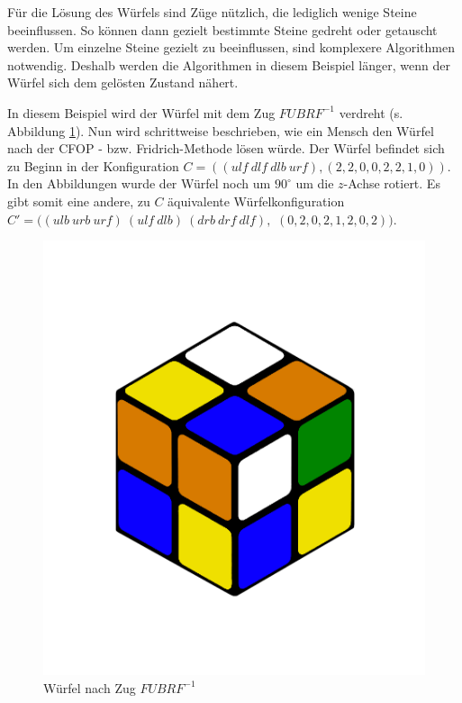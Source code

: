 \documentclass[12pt,a4paper, usenames, dvipsnames]{article}
\theoremstyle{mystyle}
\theoremstyle{definition}
\begin{document}
Für die Lösung des Würfels sind Züge nützlich, die lediglich wenige Steine beeinflussen. So können dann gezielt bestimmte Steine gedreht oder getauscht werden. Um einzelne Steine gezielt zu beeinflussen, sind komplexere Algorithmen notwendig. Deshalb werden die Algorithmen in diesem Beispiel länger, wenn der Würfel sich dem gelösten Zustand nähert. 

In diesem Beispiel wird der Würfel mit dem Zug $FUBRF^{-1}$ verdreht (s. Abbildung \ref{Abbildung_LösungMensch0}). Nun wird schrittweise beschrieben, wie ein Mensch den Würfel nach der CFOP - bzw. Fridrich-Methode lösen würde. Der Würfel befindet sich zu Beginn in der Konfiguration $C = ((\textit{ulf} \ \textit{dlf} \ \textit{dlb} \ \textit{urf}),(2,2,0,0,2,2,1,0))$.
In den Abbildungen wurde der Würfel noch um $90^\circ$ um die $z$-Achse rotiert. Es gibt somit eine andere, zu $C$ äquivalente Würfelkonfiguration $C'=(( \textit{ulb} \ \textit{urb} \ \textit{urf}) \ ( \textit{ulf} \ \textit{dlb} ) \ (\textit{drb} \ \textit{drf} \ \textit{dlf}),$ $(0,2,0,2,1,2,0,2))$.

\begin{figure}[H]
\centering
\includegraphics[scale=0.12]{LURFL1.png}
\caption{Würfel nach Zug $FUBRF^{-1}$ }
\label{Abbildung_LösungMensch0}
\end{figure}
\end{document}
